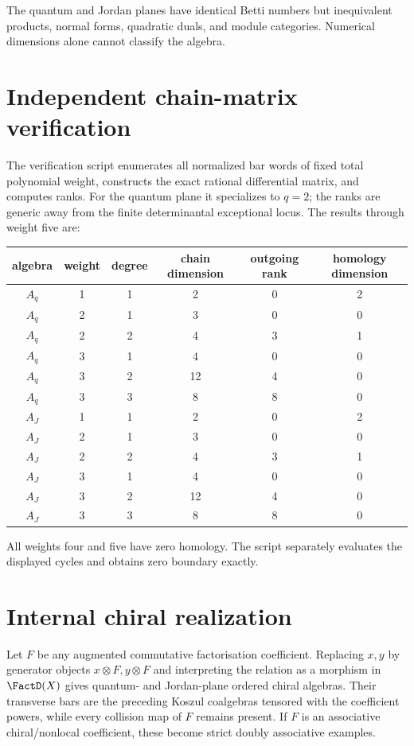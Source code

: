 The quantum and Jordan planes have identical Betti numbers but inequivalent products, normal forms, quadratic duals, and module categories.  Numerical dimensions alone cannot classify the algebra.

\section{Independent chain-matrix verification}
The verification script enumerates all normalized bar words of fixed total polynomial weight, constructs the exact rational differential matrix, and computes ranks.  For the quantum plane it specializes to \(q=2\); the ranks are generic away from the finite determinantal exceptional locus.  The results through weight five are:

\begin{center}
\begin{tabular}{c c c c c c}
\toprule
algebra & weight & degree & chain dimension & outgoing rank & homology dimension\\
\midrule
\(A_q\) &1&1&2&0&2\\
\(A_q\) &2&1&3&0&0\\
\(A_q\) &2&2&4&3&1\\
\(A_q\) &3&1&4&0&0\\
\(A_q\) &3&2&12&4&0\\
\(A_q\) &3&3&8&8&0\\
\midrule
\(A_J\) &1&1&2&0&2\\
\(A_J\) &2&1&3&0&0\\
\(A_J\) &2&2&4&3&1\\
\(A_J\) &3&1&4&0&0\\
\(A_J\) &3&2&12&4&0\\
\(A_J\) &3&3&8&8&0\\
\bottomrule
\end{tabular}
\end{center}
All weights four and five have zero homology.  The script separately evaluates the displayed cycles and obtains zero boundary exactly.

\section{Internal chiral realization}
Let \(F\) be any augmented commutative factorisation coefficient.  Replacing \(x,y\) by generator objects \(x\otimes F,y\otimes F\) and interpreting the relation as a morphism in \(\FactD(X)\) gives quantum- and Jordan-plane ordered chiral algebras.  Their transverse bars are the preceding Koszul coalgebras tensored with the coefficient powers, while every collision map of \(F\) remains present.  If \(F\) is an associative chiral/nonlocal coefficient, these become strict doubly associative examples.

